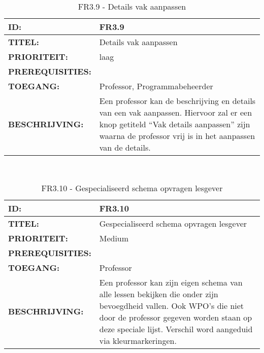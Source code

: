        
\noindent\begin{table}[H]
            \begin{tabular}{l | p{10cm}}
                \textbf{ID:} & FR3.9 \\ \hline
                \textbf{TITEL:} & Details vak aanpassen\\ \hline
                \textbf{PRIORITEIT:} &  laag \\ \hline
                \textbf{PREREQUISITIES:} & \\ \hline
                \textbf{TOEGANG:} & Professor, Programmabeheerder \\ \hline
                \textbf{BESCHRIJVING:} & Een professor kan de beschrijving en details van een vak aanpassen. Hiervoor zal er een knop getiteld “Vak details aanpassen” zijn waarna de professor vrij is in het aanpassen van de details. \\ 
            \end{tabular}\\
            \caption{FR3.9 - Details vak aanpassen}
            \label{tab:FR3.9 - Details vak aanpassen}
        \end{table}
 
\noindent\begin{table}[H]
            \begin{tabular}{l | p{10cm}}
                \textbf{ID:} & FR3.10 \\ \hline
                \textbf{TITEL:} & Gespecialiseerd schema opvragen lesgever\\ \hline
                \textbf{PRIORITEIT:} &  Medium \\ \hline
                \textbf{PREREQUISITIES:} & \\ \hline
                \textbf{TOEGANG:} & Professor \\ \hline
                \textbf{BESCHRIJVING:} & Een professor kan zijn eigen schema van alle lessen bekijken die onder zijn bevoegdheid vallen. Ook WPO's die niet door de professor gegeven worden staan op deze speciale lijst. Verschil word aangeduid via kleurmarkeringen. \\ 
            \end{tabular}\\
            \caption{FR3.10 - Gespecialiseerd schema opvragen lesgever}
            \label{tab:FR3.10 - Gespecializeerd schema opvragen lesgever}
        \end{table}

